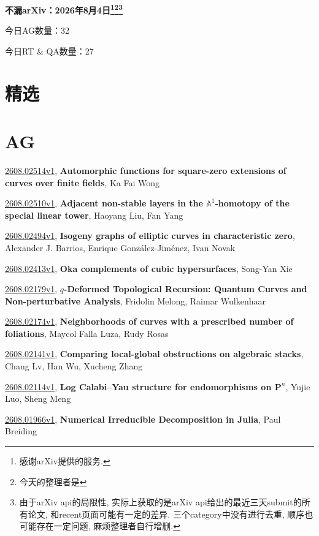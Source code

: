 \documentclass[9pt, a4paper]{article}
\theoremstyle{plain}
\theoremstyle{definition}
\theoremstyle{remark}
\newcommand{\arxiv}[3]{\href{https://arxiv.org/abs/#1}{#1}, \textbf{\textcolor{arxivblue}{#2}}, #3}
\newcommand{\AGnumber}{32}
\newcommand{\RTQAnumber}{27}
\newcommand{\NewestDate}{2026年8月4日}
\newcommand{\todayarXiver}{} %
\begin{document}
\begin{center}
    \Huge\textbf{不漏arXiv：\NewestDate\footnote{感谢arXiv提供的服务.}\footnote{今天的整理者是\todayarXiver}\footnote{由于arXiv api的局限性, 实际上获取的是arXiv api给出的最近三天submit的所有论文, 和recent页面可能有一定的差异. 三个category中没有进行去重, 顺序也可能存在一定问题, 麻烦整理者自行增删.}} \\
\end{center}

\setcounter{section}{-1}

\begin{center}
    今日AG数量：\AGnumber
    
    今日RT \& QA数量：\RTQAnumber
    
\end{center}


\section{精选}


\section{AG}
\arxiv{2608.02514v1}{Automorphic functions for square-zero extensions of curves over finite fields}{Ka Fai Wong}

\arxiv{2608.02510v1}{Adjacent non-stable layers in the $\mathbb{A}^1$-homotopy of the special linear tower}{Haoyang Liu, Fan Yang}

\arxiv{2608.02494v1}{Isogeny graphs of elliptic curves in characteristic zero}{Alexander J. Barrios, Enrique González-Jiménez, Ivan Novak}

\arxiv{2608.02413v1}{Oka complements of cubic hypersurfaces}{Song-Yan Xie}

\arxiv{2608.02179v1}{$q$-Deformed Topological Recursion: Quantum Curves and Non-perturbative Analysis}{Fridolin Melong, Raimar Wulkenhaar}

\arxiv{2608.02174v1}{Neighborhoods of curves with a prescribed number of foliations}{Maycol Falla Luza, Rudy Rosas}

\arxiv{2608.02141v1}{Comparing local-global obstructions on algebraic stacks}{Chang Lv, Han Wu, Xucheng Zhang}

\arxiv{2608.02114v1}{Log Calabi--Yau structure for endomorphisms on $\mathbf{P}^n$}{Yujie Luo, Sheng Meng}

\arxiv{2608.01966v1}{Numerical Irreducible Decomposition in Julia}{Paul Breiding}
\end{document}
